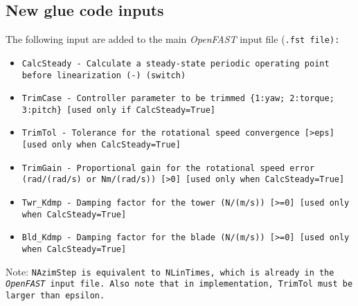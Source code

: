 \documentclass[11pt]{article}
\newcommand{\question}[1]{{\color{red}{#1}}}
\begin{document}
\subsection{New glue code inputs}
\label{sec:newinputs}
The following input are added to the main \textit{OpenFAST} input file (\tt{.fst} file):
\begin{itemize}\tightlist
    \item \tt{CalcSteady - Calculate a steady-state periodic operating point before linearization (-) (switch)}
    \item \tt{TrimCase   - Controller parameter to be trimmed \{1:yaw; 2:torque; 3:pitch\} [used only if CalcSteady=True]}
    \item \tt{TrimTol    - Tolerance for the rotational speed convergence [>eps] [used only when CalcSteady=True] }
    \item \tt{TrimGain    - Proportional gain for the rotational speed error (rad/(rad/s) or Nm/(rad/s)) [>0] [used only when CalcSteady=True] }
    \item \tt{Twr\_Kdmp   - Damping factor for the tower (N/(m/s)) [>=0] [used only when CalcSteady=True] }
    \item \tt{Bld\_Kdmp  - Damping factor for the blade (N/(m/s)) [>=0] [used only when CalcSteady=True] }
\end{itemize}

Note: \tt{NAzimStep} is equivalent to \tt{NLinTimes}, which is already in the \textit{OpenFAST} input file. Also note that in implementation,
\tt{TrimTol} must be larger than epsilon. \question{or maybe we should require it to be even larger?}
\end{document}
